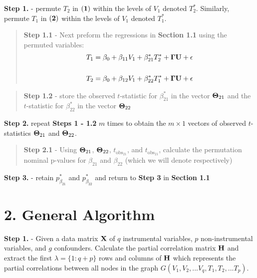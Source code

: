 \documentclass[12pt]{report}
\begin{document}
\noindent \textbf{Step 1.} - permute $T_2$ in $\bf (1)$ within the levels of $V_1$ denoted $T_2^{\ast}$. Similarly, permute $T_1$ in $\bf (2)$ within the levels of $V_1$ denoted $T_1^{\ast}$.
 
\begin{quote}
\textbf{Step 1.1} - Next preform the regressions in \textbf{Section 1.1} using the permuted variables:
\begin{eqnarray}
T_1 = \beta_0 +\beta_{11}V_1+\beta_{21}^{\ast}T_2^{\ast}+{\bf \Gamma U}+ \epsilon \\
\nonumber\\
T_2 = \beta_0 +\beta_{12}V_1+\beta_{22}^{\ast}T_1^{\ast}+{\bf \Gamma U}+ \epsilon 
\end{eqnarray}
\end{quote}

\begin{quote}
\textbf{Step 1.2} - store the observed $t$-statistic for $\beta_{21}^{\ast}$ in the vector ${\bf \Theta}_{21}$ and the $t$-statistic for $\beta_{22}^{\ast}$ in the vector ${\bf \Theta}_{22}$
\end{quote}

\noindent \textbf{Step 2.} repeat \textbf{Steps 1 - 1.2} $m$ times to obtain the $m \times 1$ vectors of observed $t$-statistics ${\bf \Theta}_{21}$ and ${\bf \Theta}_{22}$. \\

\begin{quote}
\textbf{Step 2.1} - Using ${\bf \Theta}_{21}$, ${\bf \Theta}_{22}$, $t_{\text{obs}_{21}}$, and $t_{\text{obs}_{21}}$, calculate the permutation nominal p-values for $\beta_{21}$ and $\beta_{22}$ (which we will denote  respectively)
\end{quote}

\noindent \textbf{Step 3.} - retain $p_{\beta_{21}}^{\ast}$ and $p_{\beta_{22}}^{\ast}$ and return to \textbf{Step 3} in \textbf{Section 1.1} \\


\section*{2. General Algorithm}

\textbf{Step 1.} - Given a data matrix ${\bf X}$ of $q$ instrumental variables, $p$ non-instrumental variables, and $g$ confounders. Calculate the partial correlation matrix $\bf H$ and extract the first $\lambda = \{1 : q+p\}$ rows and columns of ${\bf H}$ which represents the partial correlations between all nodes in the graph $G(V_1, V_2,...V_q, T_1, T_2, ... T_p)$.
\end{document}
